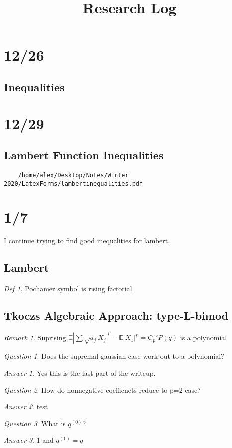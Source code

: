\documentclass[11pt]{article}
\title{Research Log}
\newcommand{\E}{\mathbb{E}}
\theoremstyle{remark}
\newtheorem*{rem}{Remark}
\newtheorem*{defi}{Def}
\newtheorem*{quest}{Question}
\newtheorem*{ans}{Answer}
\begin{document}
\maketitle

\section{12/26}

\subsection{Inequalities}

\section{12/29}

\subsection{Lambert Function Inequalities}

\begin{verbatim}
	/home/alex/Desktop/Notes/Winter 2020/LatexForms/lambertinequalities.pdf
\end{verbatim}

\section{1/7}

I continue trying to find good inequalities for lambert.

\subsection{Lambert}

\begin{defi}
	Pochamer symbol is rising factorial
\end{defi}

\subsection{Tkoczs Algebraic Approach: type-L-bimod}

\begin{rem}
	Suprising $\E|\sum \sqrt{a_j} X_j|^p - \E |X_1|^p = C_p' P(q)$ is a polynomial
\end{rem}

\begin{quest}
	Does the supremal gaussian case work out to a polynomial?
\end{quest}

\begin{ans}
	Yes this is the last part of the writeup.
\end{ans}

\begin{quest}
	How do nonnegative coefficnets reduce to p=2 case?
\end{quest}

\begin{ans}
	test
\end{ans}

\begin{quest}
	What is $q^{(0)}$?
\end{quest}
\begin{ans}
	1 and $q^{(1)} = q$
\end{ans}
\end{document}
